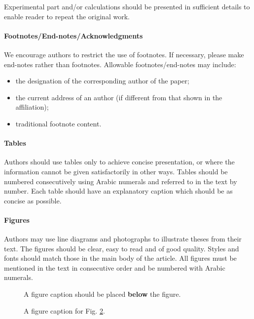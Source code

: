 \documentclass[USenglish,oneside,twocolumn]{article}
\begin{document}
    Experimental part and/or calculations should be presented in sufficient details to enable reader to repeat the original work.



\paragraph{Footnotes/End-notes/Acknowledgments}
We encourage authors to restrict the use of footnotes. If necessary, please make end-notes rather than footnotes. Allowable footnotes/end-notes may include:

\begin{itemize}
\item the designation of the corresponding author of the paper;
\item the current address of an author (if different from that shown in the affiliation);
\item traditional footnote content.
\end{itemize}

\paragraph{Tables}
    Authors should use tables only to achieve concise presentation, or where the information cannot be given satisfactorily in other ways. Tables should be numbered consecutively using Arabic numerals and referred to in the text by number. Each table should have an explanatory caption which should be as concise as possible.



\paragraph{Figures}
    Authors may use line diagrams and photographs to illustrate theses from their text. The figures should be clear, easy to read and of good quality. Styles and fonts should match those in the main body of the article. All figures must be mentioned in the text in consecutive order and be numbered with Arabic numerals. 

\begin{figure}
\caption{A figure caption should be placed {\bf below} the figure.\label{fig1}}
\end{figure}

\begin{figure}
\caption{A figure caption for Fig. \ref{fig2}.\label{fig2}}
\end{figure}
\end{document}
